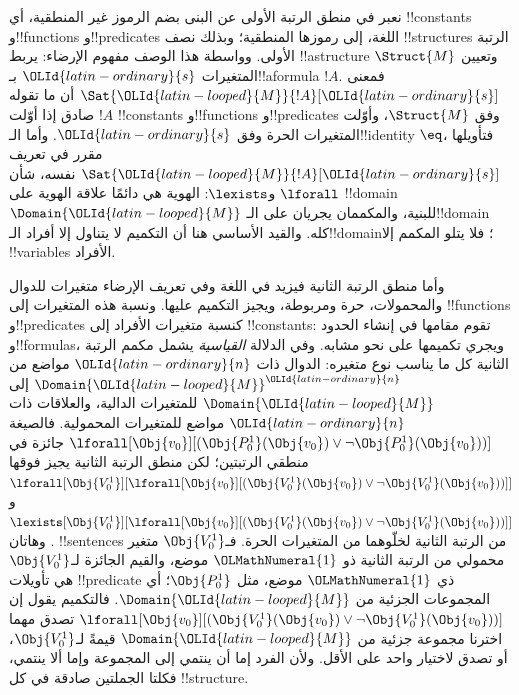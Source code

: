 \documentclass[../../../include/open-logic-section]{subfiles}
\begin{document}


نعبر في منطق الرتبة الأولى عن البنى بضم الرموز غير المنطقية،
أي !!{constant}s و!!{function}s و!!{predicate}s اللغة، إلى
رموزها المنطقية؛ وبذلك نصف !!{structure}s الرتبة الأولى.
وواسطة هذا الوصف مفهوم الإرضاء: يربط !!a{structure}
$\Struct{M}$ وتعيين المتغيرات $\OLId{latin-ordinary}{s}$ بـ!!a{formula} $!A$.
فمعنى $\Sat{\OLId{latin-looped}{M}}{!A}[\OLId{latin-ordinary}{s}]$ أن ما تقوله $!A$ صادق إذا أوّلت
!!{constant}s و!!{function}s و!!{predicate}s وفق $\Struct{M}$،
وأوّلت المتغيرات الحرة وفق $\OLId{latin-ordinary}{s}$. وأما الـ!!{identity} $\eq$،
فتأويلها مقرر في تعريف $\Sat{\OLId{latin-looped}{M}}{!A}[\OLId{latin-ordinary}{s}]$ نفسه، شأن
$\lforall$ و$\lexists$: الهوية هي دائمًا علاقة الهوية على
!!{domain} $\Domain{\OLId{latin-looped}{M}}$ للبنية، والمكممان يجريان على
الـ!!{domain} كله. والقيد الأساسي هنا أن التكميم لا يتناول إلا
أفراد الـ!!{domain}؛ فلا يتلو المكمم إلا !!{variable}s الأفراد.

وأما منطق الرتبة الثانية فيزيد في اللغة وفي تعريف الإرضاء
متغيرات للدوال والمحمولات، حرة ومربوطة، ويجيز التكميم عليها.
ونسبة هذه المتغيرات إلى !!{function}s و!!{predicate}s كنسبة
متغيرات الأفراد إلى !!{constant}s: تقوم مقامها في إنشاء الحدود
و!!{formula}s، ويجري تكميمها على نحو مشابه.
وفي الدلالة \emph{القياسية} يشمل مكمم الرتبة الثانية كل ما
يناسب نوع متغيره: الدوال ذات $\OLId{latin-ordinary}{n}$ مواضع من $\Domain{\OLId{latin-looped}{M}}^\OLId{latin-ordinary}{n}$
إلى $\Domain{\OLId{latin-looped}{M}}$ للمتغيرات الدالية، والعلاقات ذات $\OLId{latin-ordinary}{n}$ مواضع
للمتغيرات المحمولية. فالصيغة
$\lforall[\Obj{v_0}][(\Obj{P^1_0}(\Obj{v_0}) \lor \lnot
  \Obj{P^1_0}(\Obj{v_0}))]$ جائزة في منطقي الرتبتين؛
لكن منطق الرتبة الثانية يجيز فوقها
$\lforall[\Obj{V^1_0}][\lforall[\Obj{v_0}][(\Obj{V^1_0}(\Obj{v_0}) \lor
    \lnot \Obj{V^1_0}(\Obj{v_0}))]]$ و
$\lexists[\Obj{V^1_0}][\lforall[\Obj{v_0}][(\Obj{V^1_0}(\Obj{v_0}) \lor
    \lnot \Obj{V^1_0}(\Obj{v_0}))]]$.
وهاتان !!{sentence}s من الرتبة الثانية لخلّوهما من المتغيرات
الحرة. فـ$\Obj{V^1_0}$ متغير محمولي من الرتبة الثانية ذو $\OLMathNumeral{1}$
موضع، والقيم الجائزة لـ$\Obj{V^1_0}$ هي تأويلات
!!{predicate} ذي $\OLMathNumeral{1}$ موضع، مثل $\Obj{P^1_0}$؛ أي المجموعات
الجزئية من $\Domain{\OLId{latin-looped}{M}}$. فالتكميم يقول إن
$\lforall[\Obj{v_0}][(\Obj{V^1_0}(\Obj{v_0}) \lor \lnot
  \Obj{V^1_0}(\Obj{v_0}))]$ تصدق مهما اخترنا مجموعة جزئية من
$\Domain{\OLId{latin-looped}{M}}$ قيمةً لـ$\Obj{V^1_0}$، أو تصدق لاختيار واحد
على الأقل. ولأن الفرد إما أن ينتمي إلى المجموعة وإما ألا ينتمي،
فكلتا الجملتين صادقة في كل !!{structure}.
\end{document}
